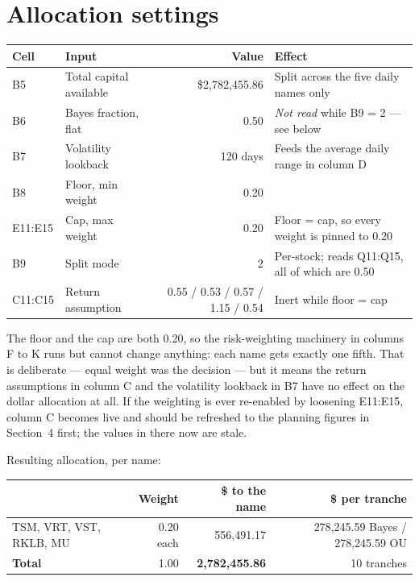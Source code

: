 \documentclass[11pt]{article}
\begin{document}
\section{Allocation settings}

\begin{center}
\footnotesize
\begin{tabular}{@{}l l r l@{}}
\toprule
\textbf{Cell} & \textbf{Input} & \textbf{Value} & \textbf{Effect} \\
\midrule
B5 & Total capital available & \$2{,}782{,}455.86 & Split across the five daily names only \\
B6 & Bayes fraction, flat    & 0.50 & \emph{Not read} while B9 = 2 --- see below \\
B7 & Volatility lookback     & 120 days & Feeds the average daily range in column D \\
B8 & Floor, min weight       & 0.20 & \\
E11:E15 & Cap, max weight    & 0.20 & Floor = cap, so every weight is pinned to 0.20 \\
B9 & Split mode              & 2 & Per-stock; reads Q11:Q15, all of which are 0.50 \\
C11:C15 & Return assumption  & 0.55 / 0.53 / 0.57 / 1.15 / 0.54 & Inert while floor = cap \\
\bottomrule
\end{tabular}
\end{center}

The floor and the cap are both 0.20, so the risk-weighting machinery in columns F to K runs but
cannot change anything: each name gets exactly one fifth. That is deliberate --- equal weight was
the decision --- but it means the return assumptions in column C and the volatility lookback in
B7 have no effect on the dollar allocation at all. If the weighting is ever re-enabled by
loosening E11:E15, column C becomes live and should be refreshed to the planning figures in
Section~4 first; the values in there now are stale.

\vspace{0.3em}
Resulting allocation, per name:

\begin{center}
\footnotesize
\begin{tabular}{@{}l r r r@{}}
\toprule
& \textbf{Weight} & \textbf{\$ to the name} & \textbf{\$ per tranche} \\
\midrule
TSM, VRT, VST, RKLB, MU & 0.20 each & 556{,}491.17 & 278{,}245.59 Bayes / 278{,}245.59 OU \\
\midrule
\textbf{Total} & 1.00 & \textbf{2{,}782{,}455.86} & 10 tranches \\
\bottomrule
\end{tabular}
\end{center}
\end{document}
